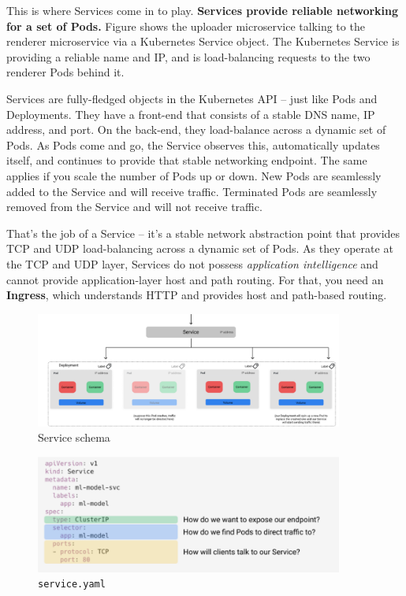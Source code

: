 \documentclass[10pt,a4paper]{report}
\begin{document}
This is where Services come in to play. \textbf{Services provide reliable networking for a set of Pods.} Figure shows the uploader microservice talking to the renderer microservice via a Kubernetes Service object. The Kubernetes Service is providing a reliable name and IP, and is load-balancing requests to the two renderer Pods behind it.

Services are fully-fledged objects in the Kubernetes API – just like Pods and Deployments. They have a front-end that consists of a stable DNS name, IP address, and port. On the back-end, they load-balance across a dynamic set of Pods. As Pods come and go, the Service observes this, automatically updates itself, and continues to provide that stable networking endpoint.
The same applies if you scale the number of Pods up or down. New Pods are seamlessly added to the Service and will receive traffic. Terminated Pods are seamlessly removed from the Service and will not receive traffic.

That’s the job of a Service – it’s a stable network abstraction point that provides TCP and UDP load-balancing across a dynamic set of Pods.
As they operate at the TCP and UDP layer, Services do not possess \textit{application intelligence} and cannot provide application-layer host and path routing. For that, you need an \textbf{Ingress}, which understands HTTP and provides host and path-based routing.

\begin{figure}[h]
	\centering
	\includegraphics[width=0.9\textwidth]{image-k8s-service}
	\caption{Service schema}
	\label{image-k8s-service}
\end{figure} 
\begin{figure}[h]
	\centering
	\includegraphics[width=0.9\textwidth]{image-service-yaml}
	\caption{\texttt{service.yaml}}
	\label{image-k8s-service-yaml}
\end{figure} 
\end{document}

